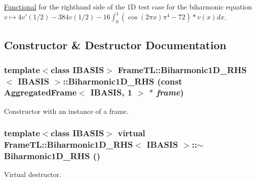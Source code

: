 \hyperlink{classFrameTL_1_1Functional}{Functional} for the righthand side of the 1D test case for the biharmonic equation $ v \mapsto 4v'(1/2) - 384v(1/2) - 16 \int_0^1 (\cos(2\pi x)\pi^4-72) * v(x) dx$. 

\subsection{Constructor \& Destructor Documentation}
\hypertarget{classFrameTL_1_1Biharmonic1D__RHS_c9600ba95f7c01ef6080a4372e0d3031}{
\subsubsection[Biharmonic1D\_\-RHS]{\setlength{\rightskip}{0pt plus 5cm}template$<$class IBASIS$>$ {\bf FrameTL::Biharmonic1D\_\-RHS}$<$ IBASIS $>$::{\bf Biharmonic1D\_\-RHS} (const {\bf AggregatedFrame}$<$ IBASIS, 1 $>$ $\ast$ {\em frame})}}
\label{classFrameTL_1_1Biharmonic1D__RHS_c9600ba95f7c01ef6080a4372e0d3031}


Constructor with an instance of a frame. \hypertarget{classFrameTL_1_1Biharmonic1D__RHS_4b3957bc2e77d88486b21916c7a74030}{
\subsubsection[$\sim$Biharmonic1D\_\-RHS]{\setlength{\rightskip}{0pt plus 5cm}template$<$class IBASIS$>$ virtual {\bf FrameTL::Biharmonic1D\_\-RHS}$<$ IBASIS $>$::$\sim${\bf Biharmonic1D\_\-RHS} ()}}
\label{classFrameTL_1_1Biharmonic1D__RHS_4b3957bc2e77d88486b21916c7a74030}


Virtual destructor. 

